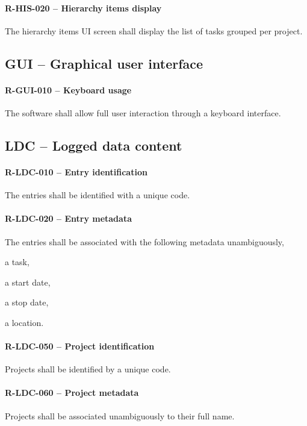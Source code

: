 \paragraph{R-HIS-020 -- Hierarchy items display}
The hierarchy items \gls{UI} screen shall display the list of tasks
grouped per project.

\subsection{GUI -- Graphical user interface}
\paragraph{R-GUI-010 -- Keyboard usage}
The software shall allow full user interaction through a keyboard interface.

\subsection{LDC -- Logged data content}
\paragraph{R-LDC-010 -- Entry identification}
The entries shall be identified with a unique code.

\paragraph{R-LDC-020 -- Entry metadata}
The entries shall be associated with the following metadata unambiguously,
\begin{compactitem}
\item a task,
\item a start date,
\item a stop date,
\item a location.
\end{compactitem}

\paragraph{R-LDC-050 -- Project identification}
Projects shall be identified by a unique code.

\paragraph{R-LDC-060 -- Project metadata}
Projects shall be associated unambiguously to their full name.

